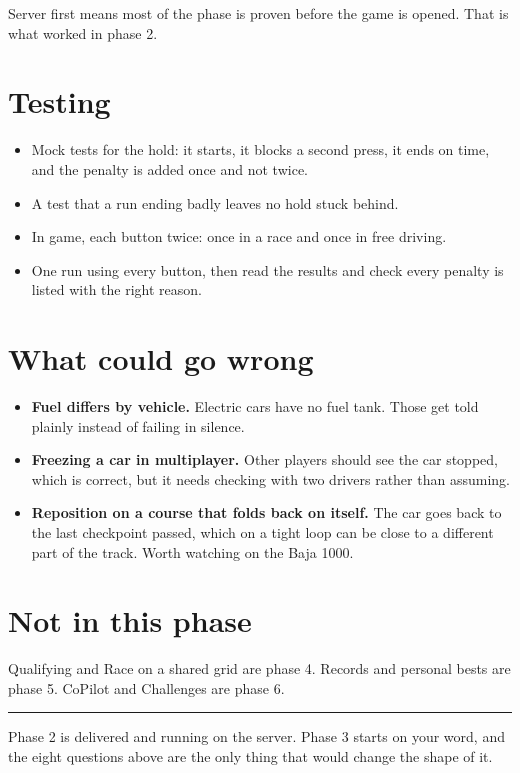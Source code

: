 \documentclass[11pt,a4paper]{article}
\begin{document}
Server first means most of the phase is proven before the game is opened.
That is what worked in phase 2.

\section{Testing}

\begin{itemize}
  \item Mock tests for the hold: it starts, it blocks a second press, it ends
        on time, and the penalty is added once and not twice.
  \item A test that a run ending badly leaves no hold stuck behind.
  \item In game, each button twice: once in a race and once in free driving.
  \item One run using every button, then read the results and check every
        penalty is listed with the right reason.
\end{itemize}

\section{What could go wrong}

\begin{itemize}
  \item \textbf{Fuel differs by vehicle.} Electric cars have no fuel tank.
        Those get told plainly instead of failing in silence.
  \item \textbf{Freezing a car in multiplayer.} Other players should see the
        car stopped, which is correct, but it needs checking with two drivers
        rather than assuming.
  \item \textbf{Reposition on a course that folds back on itself.} The car
        goes back to the last checkpoint passed, which on a tight loop can be
        close to a different part of the track. Worth watching on the Baja
        1000.
\end{itemize}

\section{Not in this phase}

Qualifying and Race on a shared grid are phase 4. Records and personal bests
are phase 5. CoPilot and Challenges are phase 6.

\vspace{10pt}
\hrule
\vspace{6pt}

{\small Phase 2 is delivered and running on the server. Phase 3 starts on your
word, and the eight questions above are the only thing that would change the
shape of it.}
\end{document}
